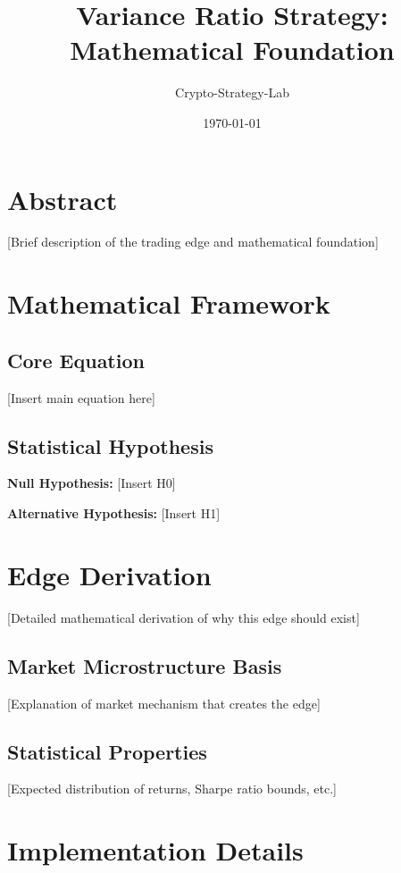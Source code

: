 \documentclass{article}
\title{Variance Ratio Strategy: Mathematical Foundation}
\author{Crypto-Strategy-Lab}
\date{\today}
\begin{document}
\maketitle

\section{Abstract}

[Brief description of the trading edge and mathematical foundation]

\section{Mathematical Framework}

\subsection{Core Equation}

[Insert main equation here]

\subsection{Statistical Hypothesis}

\textbf{Null Hypothesis:} [Insert H0]

\textbf{Alternative Hypothesis:} [Insert H1]

\section{Edge Derivation}

[Detailed mathematical derivation of why this edge should exist]

\subsection{Market Microstructure Basis}

[Explanation of market mechanism that creates the edge]

\subsection{Statistical Properties}

[Expected distribution of returns, Sharpe ratio bounds, etc.]

\section{Implementation Details}
\end{document}
